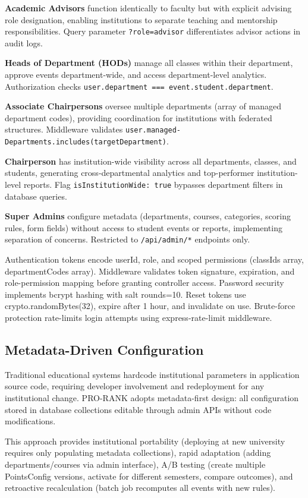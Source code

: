 \documentclass[12pt]{article}
\begin{document}
\textbf{Academic Advisors} function identically to faculty but with explicit advising role designation, enabling institutions to separate teaching and mentorship responsibilities. Query parameter \texttt{?role=advisor} differentiates advisor actions in audit logs.

\textbf{Heads of Department (HODs)} manage all classes within their department, approve events department-wide, and access department-level analytics. Authorization checks \texttt{user.department === event.student.department}.

\textbf{Associate Chairpersons} oversee multiple departments (array of managed department codes), providing coordination for institutions with federated structures. Middleware validates \texttt{user.managed-} \texttt{Departments.includes(targetDepartment)}.

\textbf{Chairperson} has institution-wide visibility across all departments, classes, and students, generating cross-departmental analytics and top-performer institution-level reports. Flag \texttt{isInstitutionWide: true} bypasses department filters in database queries.

\textbf{Super Admins} configure metadata (departments, courses, categories, scoring rules, form fields) without access to student events or reports, implementing separation of concerns. Restricted to \texttt{/api/admin/*} endpoints only.

Authentication tokens encode userId, role, and scoped permissions (classIds array, departmentCodes array). Middleware validates token signature, expiration, and role-permission mapping before granting controller access. Password security implements bcrypt hashing with salt rounds=10. Reset tokens use crypto.randomBytes(32), expire after 1 hour, and invalidate on use. Brute-force protection rate-limits login attempts using express-rate-limit middleware.

\subsection{Metadata-Driven Configuration}
Traditional educational systems hardcode institutional parameters in application source code, requiring developer involvement and redeployment for any institutional change. PRO-RANK adopts metadata-first design: all configuration stored in database collections editable through admin APIs without code modifications.

This approach provides institutional portability (deploying at new university requires only populating metadata collections), rapid adaptation (adding departments/courses via admin interface), A/B testing (create multiple PointsConfig versions, activate for different semesters, compare outcomes), and retroactive recalculation (batch job recomputes all events with new rules).
\end{document}
